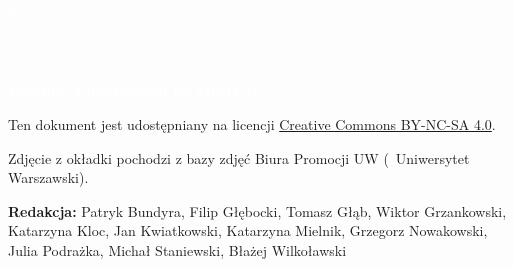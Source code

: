 \documentclass[a4paper, hidelinks]{book}
\begin{document}
\thispagestyle{empty}
\vspace*{\fill}
{\fontsize{70pt}{84pt}\selectfont\sffamily\textcolor{white}{Repetytorium \\ \vspace{3mm} \\ licencjackie}} \\ \vspace{5mm} \\
{\huge\selectfont\sffamily\bfseries\textcolor{white}{Egzamin z informatyki na MIMUW}}
\restoregeometry

\vspace*{\fill}
Ten dokument jest udostępniany na licencji \href{http://creativecommons.org/licenses/by-nc-sa/4.0/deed.pl}{Creative Commons BY-NC-SA 4.0}.

Zdjęcie z okładki pochodzi z bazy zdjęć Biura Promocji UW (\textcopyright \ Uniwersytet Warszawski).

\textbf{Redakcja:} Patryk Bundyra, Filip Głębocki, Tomasz Głąb, Wiktor Grzankowski, Katarzyna Kloc, Jan Kwiatkowski, Katarzyna Mielnik, Grzegorz Nowakowski, Julia Podrażka, Michał Staniewski, Błażej Wilkoławski
\newpage


\newpage

\begingroup
    \hypersetup{linkcolor = black}
    \setcounter{tocdepth}{1} %
    \tableofcontents
\endgroup















% 




\end{document}
